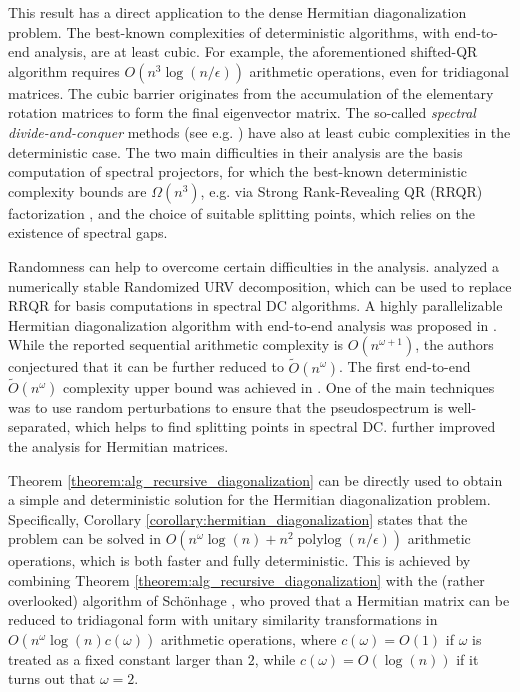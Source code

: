 \documentclass{article}
\DeclareMathOperator{\polylog}{polylog}
\begin{document}
This result has a direct application to the dense Hermitian diagonalization problem. 
The best-known complexities of deterministic algorithms, with end-to-end analysis, are at least cubic. 
For example, the aforementioned shifted-QR algorithm requires $O(n^3\log(n/\epsilon))$ arithmetic operations, even for tridiagonal matrices. 
The cubic barrier originates from the accumulation of the elementary rotation matrices to form the final eigenvector matrix. 
The so-called \emph{spectral divide-and-conquer} methods (see e.g. \cite{demmel1997applied,nakatsukasa2013stable}) have also at least cubic complexities in the deterministic case. 
The two main difficulties in their analysis are the basis computation of spectral projectors, for which the best-known deterministic complexity bounds are $\Omega(n^3)$, e.g. via Strong Rank-Revealing QR (RRQR) factorization \cite{gu1996efficient}, and the choice of suitable splitting points, which relies on the existence of spectral gaps. 

Randomness can help to overcome certain difficulties in the analysis. \cite{demmel2007fastla} analyzed a numerically stable Randomized URV decomposition, which can be used to replace RRQR for basis computations in spectral DC algorithms. A highly parallelizable Hermitian diagonalization algorithm with end-to-end analysis was proposed in \cite{benor2018quasi}. While the reported sequential arithmetic complexity is $O(n^{\omega+1})$, the authors conjectured that it can be further reduced to $\widetilde O(n^{\omega})$.  The first end-to-end $\widetilde O(n^\omega)$ complexity upper bound was achieved in
\cite{banks2022pseudospectral}. One of the main techniques was to use random perturbations to ensure that the pseudospectrum is well-separated, which helps to find splitting points in spectral DC. \cite{shah2025hermitian} further improved the analysis for Hermitian matrices.  


Theorem \ref{theorem:alg_recursive_diagonalization} can be directly used to obtain a simple and deterministic solution for the  Hermitian diagonalization problem. 
Specifically, Corollary \ref{corollary:hermitian_diagonalization} states that the problem can be solved in $O(n^{\omega}\log(n) + n^2\polylog(n/\epsilon))$ arithmetic operations, which is both faster and fully deterministic. 
This is achieved by combining Theorem \ref{theorem:alg_recursive_diagonalization} with the (rather overlooked) algorithm of Schönhage \cite{schonhage1972unitare}, who proved that a Hermitian matrix can be reduced to tridiagonal form with unitary similarity transformations in $O(n^\omega\log(n)c(\omega))$ arithmetic operations, where $c(\omega)=O(1)$ if $\omega$ is treated as a fixed constant larger than $2$, while $c(\omega)=O(\log(n))$ if it turns out that $\omega=2$. 
\end{document}
